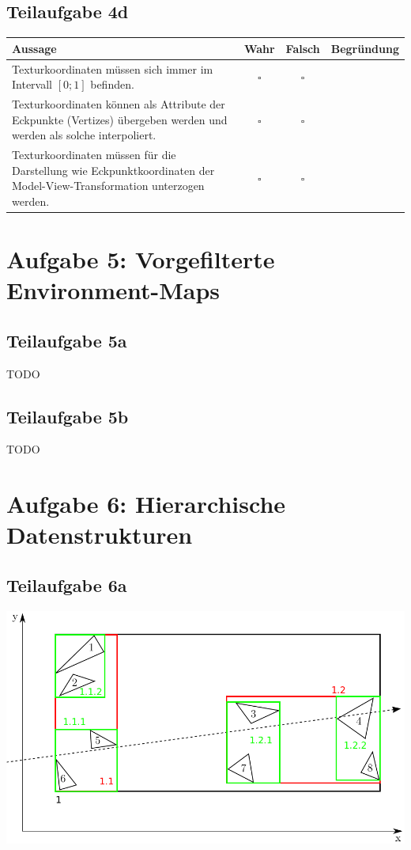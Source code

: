 \documentclass[a4paper]{scrartcl}
\begin{document}
\subsection*{Teilaufgabe 4d}
\begin{tabular}{p{6cm}ccp{5cm}}\toprule
Aussage  & Wahr & Falsch & Begründung \\\midrule
Texturkoordinaten müssen sich immer im Intervall $[0; 1]$ befinden. & $\square$ & $\square$ & ~ \\
Texturkoordinaten können als Attribute der Eckpunkte (Vertizes) übergeben werden und werden als solche interpoliert.  & $\square$    & $\square$      & ~          \\
Texturkoordinaten müssen für die Darstellung wie Eckpunktkoordinaten der Model-View-Transformation unterzogen werden. & $\square$    & $\square$      & ~          \\\bottomrule
\end{tabular}


\section*{Aufgabe 5: Vorgefilterte Environment-Maps}
\subsection*{Teilaufgabe 5a}
TODO
\subsection*{Teilaufgabe 5b}
TODO

\section*{Aufgabe 6: Hierarchische Datenstrukturen}
\subsection*{Teilaufgabe 6a}
\includegraphics*[width=0.8\linewidth, keepaspectratio]{6a.png}
\end{document}
